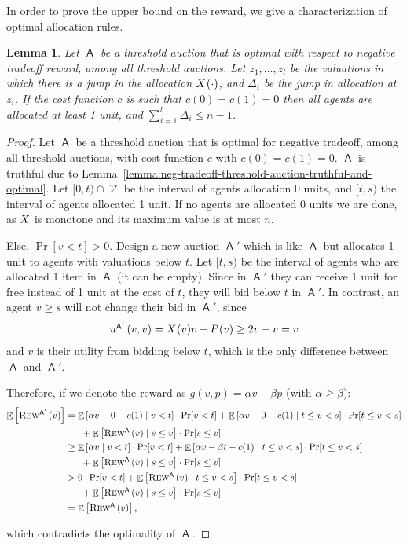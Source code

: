 \documentclass[11pt,letterpaper]{article}
\newcommand{\sqbr}[1]{\left[ #1 \right]}
\DeclareMathOperator*{\E}{\bb{E}}
\newcommand{\bb}[1]{\mathbb{#1}}
\DeclareMathOperator{\A}{\auc{A}}
\DeclareMathOperator{\V}{\mathcal{V}}
\newcommand{\g}{g}
\theoremstyle{plain}
\newtheorem{lemma}[theorem]{Lemma}
\newcommand{\auc}[1]{\mathsf{#1}}
\begin{document}
In order to prove the upper bound on the reward, we give a characterization of optimal allocation rules. 

\begin{lemma}\label{lemma:consumer-surplus-jumps}
    Let $\A$ be a threshold auction that is optimal with respect to negative tradeoff reward, among all threshold auctions.
    Let $z_1,\dots,z_l$ be the valuations in which there is a jump in the allocation $\x{\cdot}$, and $\Delta_i$ be the jump in allocation at $z_i$.
    If the cost function $c$ is such that $c(0)=c(1)=0$ then
     all agents are allocated at least 1 unit, and $\sum_{i=1}^l\Delta_i\leq n-1$.
\end{lemma}
\begin{proof}
    Let $\A$ be a threshold auction that is optimal for negative tradeoff, among all threshold auctions, with cost function $c$ with $c(0)=c(1)=0$. $\A$ is truthful due to Lemma~\ref{lemma:neg-tradeoff-threshold-auction-truthful-and-optimal}. Let $[0,t)\cap\V$ be the interval of agents allocation $0$ units, and $[t,s)$ the interval of agents allocated 1 unit. If no agents are allocated 0 units we are done, as $\alloc$ is monotone and its maximum value is at most $n$.
    
    Else, $\Pr[v<t]>0$. Design a new auction $\A'$ which is like $\A$ but allocates 1 unit to agents with valuations below $t$.
    Let $[t,s)$ be the interval of agents who are allocated 1 item in $\A$ (it can be empty). Since in $\A'$ they can receive 1 unit for free instead of 1 unit at the cost of $t$, they will bid below $t$ in $\A'$. In contrast, an agent $v\geq s$ will not change their bid in $\A'$, since
    \begin{align*}
        \util[\A']{v}{v}=\x{v}v-\p{v}\geq 2v-v=v
    \end{align*}
    and $v$ is their utility from bidding below $t$, which is the only difference between $\A$ and $\A'$.

    Therefore, if we denote the reward as $\g(v,p)=\alpha v-\beta p$ (with $\alpha\geq\beta$):
    \begin{align*}
        \E\sqbr{\trew[\A']{v}}
        &=\E\sqbr{\alpha v-0-c(1)\mid v<t}\cdot\Pr[v<t]+\E\sqbr{\alpha v-0-c(1)\mid t\leq v<s}\cdot\Pr[t\leq v<s]\\
        &\ \ \ \ \ +\E\sqbr{\trew[\A]{v}\mid s\leq v}\cdot\Pr[s\leq v]\\
        &\geq\E\sqbr{\alpha v\mid v<t}\cdot\Pr[v<t]+\E\sqbr{\alpha v-\beta t-c(1)\mid t\leq v<s}\cdot\Pr[t\leq v<s]\\
        &\ \ \ \ \ +\E\sqbr{\trew[\A]{v}\mid s\leq v}\cdot\Pr[s\leq v]\\
        &>0\cdot\Pr[v<t]+\E\sqbr{\trew[\A]{v}\mid t\leq v<s}\cdot\Pr[t\leq v<s]\\
        &\ \ \ \ \ +\E\sqbr{\trew[\A]{v}\mid s\leq v}\cdot\Pr[s\leq v]\\
        &=\E\sqbr{\trew[\A]{v}},
    \end{align*}

    which contradicts the optimality of $\A$.
\end{proof}
\end{document}
